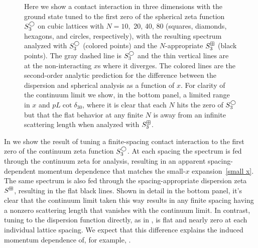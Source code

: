 \begin{figure}
    \scalebox{0.8}{}
    \caption{
        Here we show a contact interaction in three dimensions with the ground state tuned to the first zero of the spherical zeta function $S^{\bigcirc}_3$ on cubic lattices with $N=10,$ 20, 40, 80 (squares, diamonds, hexagons, and circles, respectively), with the resulting spectrum analyzed with $S^{\bigcirc}_3$ (colored points) and the $N$-appropriate $S^{\boxplus}_3$ (black points).
        The gray dashed line is $S^\bigcirc_3$ and the thin vertical lines are at the non-interacting $x$s where it diverges.
        The colored lines are the second-order analytic prediction for the difference between the dispersion and spherical analysis as a function of $x$.
        For clarity of the continuum limit we show, in the bottom panel, a limited range in $x$ and $pL\cot\delta_{30}$, where it is clear that each $N$ hits the zero of $S^\bigcirc_3$ but that the flat behavior at any finite $N$ is away from an infinite scattering length when analyzed with $S^\boxplus_3$.
    }
    \label{fig:3d-corrections}
\end{figure}



In  we show the result of tuning a finite-spacing contact interaction to the first zero of the continuum zeta function $S^\bigcirc_3$.
At each spacing the spectrum is fed through the continuum zeta for analysis, resulting in an apparent spacing-dependent momentum dependence that matches the small-$x$ expansion~\eqref{small x}.
The same spectrum is also fed through the spacing-appropriate dispersion zeta $S^\boxplus$, resulting in the flat black lines.
Shown in detail in the bottom panel, it's clear that the continuum limit taken this way results in any finite spacing having a nonzero scattering length that vanishes with the continuum limit.
In contrast, tuning to the dispersion function directly, as in , is flat and nearly zero at each individual lattice spacing.
We expect that this difference explains the induced momentum dependence of, for example, .
